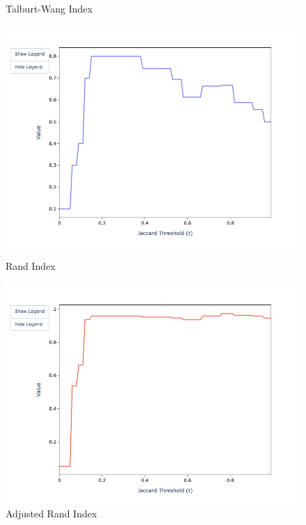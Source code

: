 \documentclass{article}
\begin{document}
    \begin{figure}[htbp]
        \begin{minipage}{0.32\textwidth}
            \centering
            \caption*{Talburt-Wang Index}
            \includegraphics[width=\textwidth]{sample-usage/mini-alg-twi}
        \end{minipage}    
        \begin{minipage}{0.32\textwidth}
            \centering
            \caption*{Rand Index}
            \includegraphics[width=\textwidth]{sample-usage/mini-alg-ri}
        \end{minipage}    
        \begin{minipage}{0.32\textwidth}
            \centering
            \caption*{Adjusted Rand Index}

\end{minipage}
\end{figure}
\end{document}
